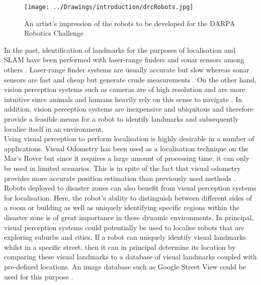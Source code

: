 \documentclass[11pt]{report}
\begin{document}
\begin{figure}[h!] 
  \centering
    \texttt{[image: ../Drawings/introduction/drcRobots.jpg]}
    \caption{An artist's impression of the robots to be developed for the DARPA Robotics Challenge}
    \label{fig:darpa}
\end{figure}

In the past, identification of landmarks for the purposes of localisation and SLAM have been performed with laser-range finders and sonar sensors among others \cite{Davison2007}. Laser-range finder systems are usually accurate but slow whereas sonar sensors are fast and cheap but generate crude measurements \cite{Se2002}. On the other hand, vision perception systems such as cameras are of high resolution and are more intuitive since animals and humans heavily rely on this sense to navigate \cite{Davison2007}. In addition, vision perception systems are inexpensive and ubiquitous and therefore provide a feasible means for a robot to identify landmarks and subsequently localise itself in an environment.\\

Using visual perception to perform localisation is highly desirable in a number of applications. Visual Odometry has been used as a localisation technique on the Mar's Rover \cite{Di2008} but since it requires a large amount of processing time, it can only be used in limited scenarios. This is in spite of the fact that visual odometry provides more accurate position estimation than previously used methods \cite{Powell2006}. Robots deployed to disaster zones can also benefit from visual perception systems for localisation. Here, the robot's ability to distinguish between different sides of a room or building as well as uniquely identifying specific regions within the disaster zone is of great importance in these dynamic environments. In principal, visual perception systems could potentially be used to localise robots that are exploring suburbs and cities. If a robot can uniquely identify visual landmarks whilst in a specific street, then it can in principal determine its location by comparing these visual landmarks to a database of visual landmarks coupled with pre-defined locations. An image database such as Google Street View could be used for this purpose \cite{StreetView}.\\
\end{document}
